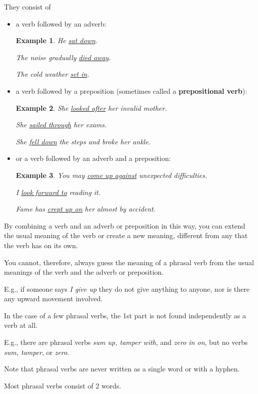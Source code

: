 \documentclass[oneside]{book}
\numberwithin{equation}{section}
\newtheorem{example}{Example}[section]
\begin{document}
They consist of
\begin{itemize}
    \item a verb followed by an adverb:
    \begin{example}
        He \underline{sat down}.
        
        The noise gradually \underline{died away}.
        
        The cold weather \underline{set in}.
    \end{example}
    \item a verb followed by a preposition (sometimes called a \textbf{prepositional verb}):
    \begin{example}
        She \underline{looked after} her invalid mother.
        
        She \underline{sailed through} her exams.
        
        She \underline{fell down} the steps and broke her ankle.
    \end{example}
    \item or a verb followed by an adverb and a preposition:
    \begin{example}
        You may \underline{come up against} unexpected difficulties.
        
        I \underline{look forward to} reading it.
        
        Fame has \underline{crept up on} her almost by accident.
    \end{example}
\end{itemize}
By combining a verb and an adverb or preposition in this way, you can extend the usual meaning of the verb or create a new meaning, different from any that the verb has on its own.

You cannot, therefore, always guess the meaning of a phrasal verb from the usual meanings of the verb and the adverb or preposition.

E.g., if someone says \textit{I give up} they do not give anything to anyone, nor is there any upward movement involved.

%
In the case of a few phrasal verbs, the 1st part is not found independently as a verb at all.

E.g., there are phrasal verbs \textit{sum up, tamper with}, and \textit{zero in on}, but no verbs \textit{sum, tamper}, or \textit{zero}.

%
Note that phrasal verbs are never written as a single word or with a hyphen.

%
\noindent{} Most phrasal verbs consist of 2 words.
\end{document}
